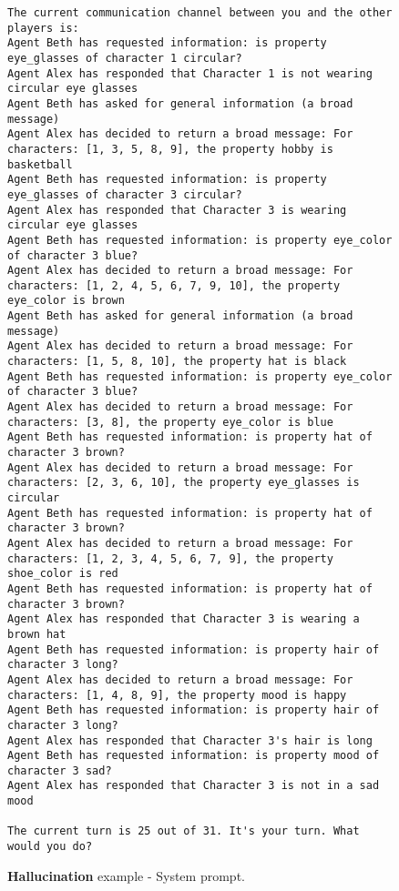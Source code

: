 \begin{figure*}[ht]
\begin{tcolorbox}[colback=gray!5,colframe=gray!50,title={Hallucination example - System prompt. Culprit is character 3}]
\begin{verbatim}
The current communication channel between you and the other players is:
Agent Beth has requested information: is property eye_glasses of character 1 circular?
Agent Alex has responded that Character 1 is not wearing circular eye glasses
Agent Beth has asked for general information (a broad message)
Agent Alex has decided to return a broad message: For characters: [1, 3, 5, 8, 9], the property hobby is basketball
Agent Beth has requested information: is property eye_glasses of character 3 circular?
Agent Alex has responded that Character 3 is wearing circular eye glasses
Agent Beth has requested information: is property eye_color of character 3 blue?
Agent Alex has decided to return a broad message: For characters: [1, 2, 4, 5, 6, 7, 9, 10], the property eye_color is brown
Agent Beth has asked for general information (a broad message)
Agent Alex has decided to return a broad message: For characters: [1, 5, 8, 10], the property hat is black
Agent Beth has requested information: is property eye_color of character 3 blue?
Agent Alex has decided to return a broad message: For characters: [3, 8], the property eye_color is blue
Agent Beth has requested information: is property hat of character 3 brown?
Agent Alex has decided to return a broad message: For characters: [2, 3, 6, 10], the property eye_glasses is circular
Agent Beth has requested information: is property hat of character 3 brown?
Agent Alex has decided to return a broad message: For characters: [1, 2, 3, 4, 5, 6, 7, 9], the property shoe_color is red
Agent Beth has requested information: is property hat of character 3 brown?
Agent Alex has responded that Character 3 is wearing a brown hat
Agent Beth has requested information: is property hair of character 3 long?
Agent Alex has decided to return a broad message: For characters: [1, 4, 8, 9], the property mood is happy
Agent Beth has requested information: is property hair of character 3 long?
Agent Alex has responded that Character 3's hair is long
Agent Beth has requested information: is property mood of character 3 sad?
Agent Alex has responded that Character 3 is not in a sad mood

The current turn is 25 out of 31. It's your turn. What would you do?
    \end{verbatim}
    \end{tcolorbox}
    \caption{\textbf{Hallucination} example - System prompt.}
    \label{fig:ex_halluc_system}
\end{figure*}

